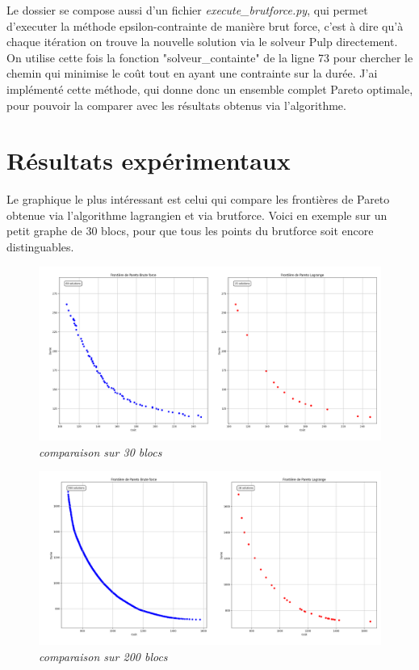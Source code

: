 \documentclass[]{article}
\begin{document}
        Le dossier se compose aussi d'un fichier \textit{execute\_brutforce.py}, qui
        permet d'executer la méthode epsilon-contrainte de manière brut force, c'est 
        à dire qu'à chaque itération on trouve la nouvelle solution via le solveur Pulp
        directement. On utilise cette fois la fonction "solveur\_containte" de la ligne 73
        pour chercher le chemin qui minimise le coût tout en ayant une contrainte sur la 
        durée. J'ai implémenté cette méthode, qui donne donc un ensemble complet Pareto optimale,
        pour pouvoir la comparer avec les résultats obtenus via l'algorithme.

        \section{Résultats expérimentaux}

        Le graphique le plus intéressant est celui qui compare les frontières de Pareto
        obtenue via l'algorithme lagrangien et via brutforce. Voici en exemple sur un petit
        graphe de 30 blocs, pour que tous les points du brutforce soit encore distinguables.
        
        \begin{figure}[H]
            \centering
            \includegraphics[width=1.25\textwidth]{Résultats/comparaison/30 blocks.png}
            \caption{\textit{comparaison sur 30 blocs}}
        \end{figure}

        \begin{figure}[H]
            \hspace{-2cm}
            \centering
            \includegraphics[width=1.25\textwidth]{Résultats/comparaison/200.png}
            \caption{\textit{comparaison sur 200 blocs}}
        \end{figure}
\end{document}
